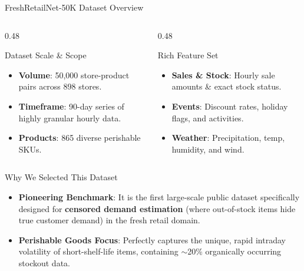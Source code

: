 \documentclass[10pt, aspectratio=169]{beamer}
\begin{document}
\begin{frame}{FreshRetailNet-50K Dataset Overview}
  \small
  \begin{columns}[T]
    \begin{column}{0.48\textwidth}
      \begin{block}{Dataset Scale \& Scope}
        \begin{itemize}
          \item \textbf{Volume}: 50,000 store-product pairs across 898 stores.
          \item \textbf{Timeframe}: 90-day series of highly granular hourly data.
          \item \textbf{Products}: 865 diverse perishable SKUs.
        \end{itemize}
      \end{block}
    \end{column}
    
    \begin{column}{0.48\textwidth}
      \begin{exampleblock}{Rich Feature Set}
        \begin{itemize}
          \item \textbf{Sales \& Stock}: Hourly sale amounts \& exact stock status.
          \item \textbf{Events}: Discount rates, holiday flags, and activities.
          \item \textbf{Weather}: Precipitation, temp, humidity, and wind.
        \end{itemize}
      \end{exampleblock}
    \end{column}
  \end{columns}
  
  \vspace{2pt}
  \begin{alertblock}{Why We Selected This Dataset}
    \begin{itemize}
      \item \textbf{Pioneering Benchmark}: It is the first large-scale public dataset specifically designed for \textbf{censored demand estimation} (where out-of-stock items hide true customer demand) in the fresh retail domain.
      \item \textbf{Perishable Goods Focus}: Perfectly captures the unique, rapid intraday volatility of short-shelf-life items, containing $\sim$20\% organically occurring stockout data.
    \end{itemize}
  \end{alertblock}
\end{frame}
\end{document}
